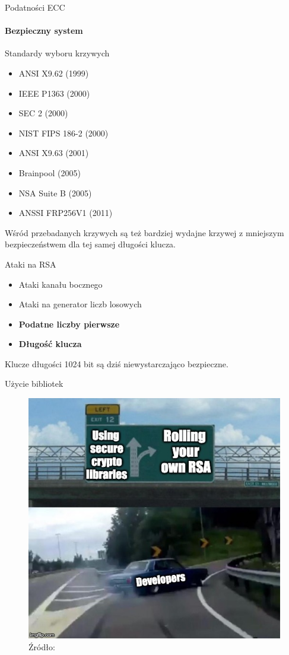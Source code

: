 \begin{frame}{Podatności ECC}
    \framesubtitle{Bezpieczny system}
    Standardy wyboru krzywych \cite{SafeCurves}
    \begin{scriptsize}
        \begin{itemize}
            \item ANSI X9.62 (1999)
            \item IEEE P1363 (2000)
            \item SEC 2 (2000)
            \item NIST FIPS 186-2 (2000)
            \item ANSI X9.63 (2001)
            \item Brainpool (2005)
            \item NSA Suite B (2005)
            \item ANSSI FRP256V1 (2011)
        \end{itemize}
    \end{scriptsize}
    \vspace{3mm}
    Wśród przebadanych krzywych są też bardziej wydajne krzywej z mniejszym bezpieczeństwem dla tej samej długości klucza. \cite{PracticalCryptographyForDevelopers}
\end{frame}

\begin{frame}{Ataki na RSA}
\begin{itemize}
    \item Ataki kanału bocznego
    \item Ataki na generator liczb losowych
    \pause
    \item \textbf{Podatne liczby pierwsze}
    \pause
    \item \textbf{Długość klucza}
\end{itemize}
Klucze długości 1024 bit są dziś niewystarczająco bezpieczne.
\end{frame}

\begin{frame}{Użycie bibliotek}
\pause
\begin{figure}
    \centering
        \includegraphics[height=0.55\textwidth]{security/graphics/developer-implements-rsa-car-meme}
        \caption{Źródło: \cite{SeriouslyStopUsingRsa}}
\end{figure}
\end{frame}
